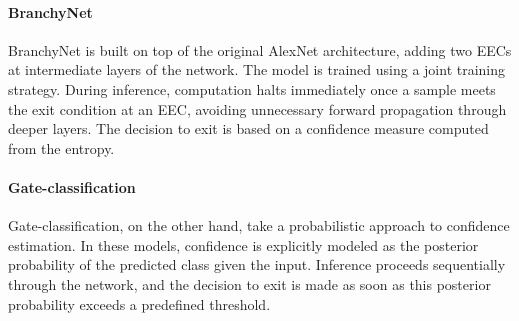 \paragraph*{BranchyNet}
BranchyNet is built on top of the original AlexNet architecture, adding two EECs at intermediate layers of the network. 
The model is trained using a joint training strategy. 
During inference, computation halts immediately once a sample meets the exit condition at an EEC, avoiding unnecessary forward propagation through deeper layers. 
The decision to exit is based on a confidence measure computed from the entropy.

\paragraph*{Gate-classification}
Gate-classification, on the other hand, take a probabilistic approach to confidence estimation. 
In these models, confidence is explicitly modeled as the posterior probability of the predicted class given the input. 
Inference proceeds sequentially through the network, and the decision to exit is made as soon as this posterior probability exceeds a predefined threshold. 